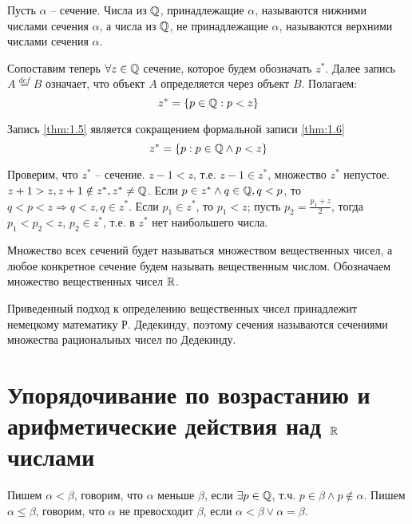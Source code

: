 \documentclass[main]{subfiles}
\begin{document}
\begin{term}
    Пусть $\alpha$ -- сечение. Числа из $\mathbb{Q}$, принадлежащие $\alpha$, называются
    нижними числами сечения $\alpha$, а числа из $\mathbb{Q}$, не принадлежащие $\alpha$,
    называются верхними числами сечения $\alpha$.
\end{term}

Сопоставим теперь $\forall z \in \mathbb{Q}$ сечение, которое будем обозначать $z^*$.
Далее запись $A \overset{def}{=} B$ означает, что объект $A$ определяется через
объект $B$. Полагаем:
\begin{equation}
    \label{thm:1.5}
    z^* = \{ p \in \mathbb{Q} : p < z \}
\end{equation}

Запись \eqref{thm:1.5} является сокращением формальной записи \eqref{thm:1.6}
\begin{equation}
    \label{thm:1.6}
    z^* = \{ p: p \in \mathbb{Q} \wedge p < z \}
\end{equation}

Проверим, что $z^*$ -- сечение. $z - 1 < z$, т.е. $z - 1 \in z^*$,
множество $z^*$ непустое. $z + 1 > z, z + 1 \notin z^*, z^* \neq \mathbb{Q}$.
Если $p \in z^* \wedge q \in \mathbb{Q}, q < p$, то $q < p < z \Rightarrow
    q < z, q \in z^*$. Если $p_1 \in z^*$, то ${p_1 < z}$;
пусть $p_2 = \frac{p_1 + z}{2}$, тогда $p_1 < p_2 < z$, $p_2 \in z^*$, т.е.
в $z^*$ нет наибольшего числа.

\begin{definition}
    Множество всех сечений будет называться множеством вещественных чисел, а любое
    конкретное сечение будем называть вещественным числом. Обозначаем множество
    вещественных чисел $\mathbb{R}$.
\end{definition}

Приведенный подход к определению вещественных чисел принадлежит немецкому
математику Р. Дедекинду, поэтому сечения называются сечениями множества
рациональных чисел по Дедекинду.

\section{Упорядочивание по возрастанию и арифметические действия над $\mathbb{R}$ числами}
\begin{definition}
    Пишем $\alpha < \beta$, говорим, что $\alpha$ меньше $\beta$, если
    $\exists p \in \mathbb{Q}$, т.ч. $p \in \beta \wedge p \notin \alpha$.
    Пишем $\alpha \leq \beta$, говорим, что $\alpha$ не превосходит $\beta$,
    если $\alpha < \beta \vee \alpha = \beta$.
\end{definition}
\end{document}
